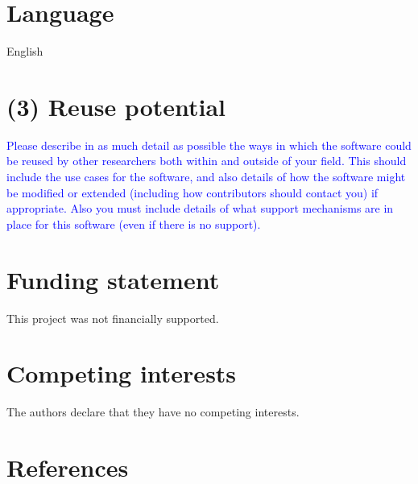 \documentclass{jors}
\begin{document}
\section*{Language}
English

\section*{(3) Reuse potential}

\textcolor{blue}{Please describe in as much detail as possible the ways in which the software could be reused by other researchers both within and outside of your field. This should include the use cases for the software, and also details of how the software might be modified or extended (including how contributors should contact you) if appropriate. Also you must include details of what support mechanisms are in place for this software (even if there is no support).}



\section*{Funding statement}
This project was not financially supported.

\section*{Competing interests}
The authors declare that they have no competing interests.

\section*{References}
\end{document}

